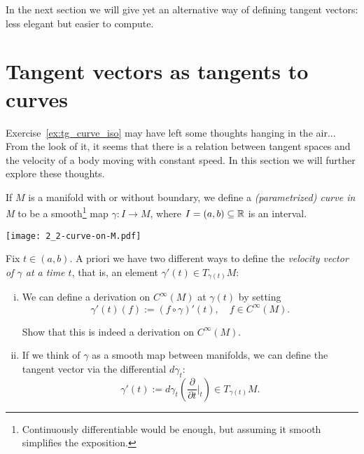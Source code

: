 In the next section we will give yet an alternative way of defining tangent vectors: less elegant but easier to compute.


\section{Tangent vectors as tangents to curves}

Exercise~\ref{ex:tg_curve_iso} may have left some thoughts hanging in the air...
From the look of it, it seems that there is a relation between tangent spaces and the velocity of a body moving with constant speed.
In this section we will further explore these thoughts.

\begin{definition}
  If $M$ is a manifold with or without boundary, we define a \emph{(parametrized) curve in M} to be a smooth\footnote{Continuously differentiable would be enough, but assuming it smooth simplifies the exposition.} map $\gamma : I \to M$, where $I=(a,b)\subseteq\mathbb{R}$ is an interval.
\end{definition}
\begin{marginfigure}
  \texttt{[image: 2\_2-curve-on-M.pdf]}
\end{marginfigure}

Fix $t\in(a,b)$. 
A priori we have two different ways to define the \emph{velocity vector of $\gamma$ at a time $t$}, that is, an element $\gamma'(t) \in T_{\gamma(t)}M$:
\begin{enumerate}[(i)]
  \item We can define a derivation on $C^\infty(M)$ at $\gamma(t)$ by setting
  \begin{equation}\label{eq:tg_curve_der}
    \gamma'(t) (f) := (f\circ\gamma)'(t), \quad f\in C^\infty(M).
  \end{equation}
  \begin{exercise}
    Show that this is indeed a derivation on $C^\infty(M)$.
  \end{exercise}
  \item If we think of $\gamma$ as a smooth map between manifolds, we can define the tangent vector via the differential $d\gamma_t$:
  \begin{equation}\label{eq:tg_curve_diff}
    \gamma'(t):= d\gamma_t\left(\frac{\partial}{\partial t}\Big|_t\right) \in T_{\gamma(t)}M.
  \end{equation}
\end{enumerate}

